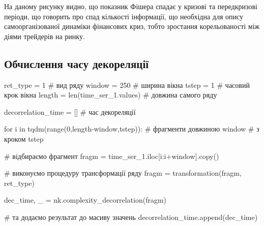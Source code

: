 \documentclass[
  letterpaper,
]{report}
\newenvironment{Shaded}{\begin{snugshade}}{\end{snugshade}}
\newcommand{\BuiltInTok}[1]{\textcolor[rgb]{0.00,0.23,0.31}{#1}}
\newcommand{\CommentTok}[1]{\textcolor[rgb]{0.37,0.37,0.37}{#1}}
\newcommand{\ControlFlowTok}[1]{\textcolor[rgb]{0.00,0.23,0.31}{#1}}
\newcommand{\DecValTok}[1]{\textcolor[rgb]{0.68,0.00,0.00}{#1}}
\newcommand{\KeywordTok}[1]{\textcolor[rgb]{0.00,0.23,0.31}{#1}}
\newcommand{\NormalTok}[1]{\textcolor[rgb]{0.00,0.23,0.31}{#1}}
\newcommand{\OperatorTok}[1]{\textcolor[rgb]{0.37,0.37,0.37}{#1}}
\begin{document}
На даному рисунку видно, що показник Фішера спадає у кризові та
передкризові періоди, що говорить про спад кількості інформації, що
необхідна для опису самоорганізованої динаміки фінансових криз, тобто
зростання корельованості між діями трейдерів на ринку.

\hypertarget{ux43eux431ux447ux438ux441ux43bux435ux43dux43dux44f-ux447ux430ux441ux443-ux434ux435ux43aux43eux440ux435ux43bux44fux446ux456ux457}{%
\subsection{Обчислення часу
декореляції}\label{ux43eux431ux447ux438ux441ux43bux435ux43dux43dux44f-ux447ux430ux441ux443-ux434ux435ux43aux43eux440ux435ux43bux44fux446ux456ux457}}

\begin{Shaded}
\begin{Highlighting}[]
\NormalTok{ret\_type }\OperatorTok{=} \DecValTok{1}                      \CommentTok{\# вид ряду}
\NormalTok{window }\OperatorTok{=} \DecValTok{250}                      \CommentTok{\# ширина вікна}
\NormalTok{tstep }\OperatorTok{=} \DecValTok{1}                         \CommentTok{\# часовий крок вікна }
\NormalTok{length }\OperatorTok{=} \BuiltInTok{len}\NormalTok{(time\_ser\_1.values)   }\CommentTok{\# довжина самого ряду }

\NormalTok{decorrelation\_time }\OperatorTok{=}\NormalTok{ []           }\CommentTok{\# час декореляції}
\end{Highlighting}
\end{Shaded}

\begin{Shaded}
\begin{Highlighting}[]
\ControlFlowTok{for}\NormalTok{ i }\KeywordTok{in}\NormalTok{ tqdm(}\BuiltInTok{range}\NormalTok{(}\DecValTok{0}\NormalTok{,length}\OperatorTok{{-}}\NormalTok{window,tstep)):       }\CommentTok{\# фрагменти довжиною window  }
                                                   \CommentTok{\# з кроком tstep}

    \CommentTok{\# відбираємо фрагмент}
\NormalTok{    fragm }\OperatorTok{=}\NormalTok{ time\_ser\_1.iloc[i:i}\OperatorTok{+}\NormalTok{window].copy()   }

    \CommentTok{\# виконуємо процедуру трансформації ряду }
\NormalTok{    fragm }\OperatorTok{=}\NormalTok{ transformation(fragm, ret\_type)}

\NormalTok{    dec\_time, \_ }\OperatorTok{=}\NormalTok{ nk.complexity\_decorrelation(fragm) }

    \CommentTok{\# та додаємо результат до масиву значень}
\NormalTok{    decorrelation\_time.append(dec\_time)}
\end{Highlighting}
\end{Shaded}
\end{document}
